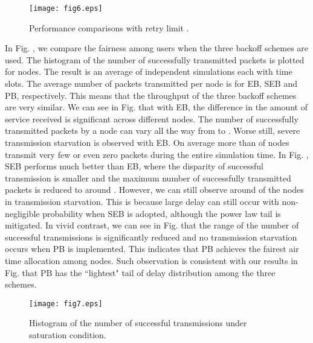\documentclass[journal]{IEEEtran}
\begin{document}
\begin{figure}
\centering
  \begin{center}
    \texttt{[image: fig6.eps]}
  \end{center}
  \caption{Performance comparisons with retry limit .}
  \label{56}
\end{figure}

In Fig. , we compare the fairness among users when the three backoff schemes are used. The histogram of the number of successfully transmitted packets is plotted for  nodes. The result is an average of  independent simulations each with  time slots. The average number of packets transmitted per node is  for EB, SEB and PB, respectively. This means that the throughput of the three backoff schemes are very similar. We can see in Fig.  that with EB, the difference in the amount of service received is significant across different nodes. The number of successfully transmitted packets by a node can vary all the way from  to . Worse still, severe transmission starvation is observed with EB. On average more than  of nodes transmit very few or even zero packets during the entire simulation time. In Fig. , SEB performs much better than EB, where the disparity of successful transmission is smaller and the maximum number of successfully transmitted packets is reduced to around . However, we can still observe around  of the nodes in transmission starvation. This is because large delay can still occur with non-negligible probability when SEB is adopted, although the power law tail is mitigated. In vivid contrast, we can see in Fig.  that the range of the number of successful transmissions is significantly reduced and no transmission starvation occurs when PB is implemented. This indicates that PB achieves the fairest air time allocation among nodes. Such observation is consistent with our results in Fig.  that PB has the ``lightest" tail of delay distribution among the three schemes.


\begin{figure}
\centering
  \begin{center}
    \texttt{[image: fig7.eps]}
  \end{center}
  \caption{Histogram of the number of successful transmissions under saturation condition.}
  \label{57}
\end{figure}
\end{document}
